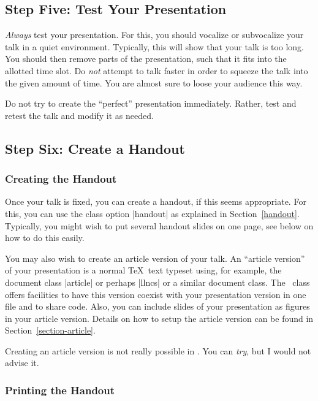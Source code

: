 \subsection{Step Five: Test Your Presentation}

\emph{Always} test your presentation. For this, you should
vocalize or subvocalize your talk in a quiet environment. Typically,
this will show that your talk is too long. You should then remove
parts of the presentation, such that it fits into the allotted time
slot. Do \emph{not} attempt to talk faster in order to squeeze the
talk into the given amount of time. You are almost sure to loose your
audience this way.

Do not try to create the ``perfect'' presentation immediately. Rather,
test and retest the talk and modify it as needed. 




\subsection{Step Six: Create a Handout}

\subsubsection{Creating the Handout}

Once your talk is fixed, you can create a handout, if this seems
appropriate. For this, you can use the class option |handout| as
explained in Section~\ref{handout}. Typically, you might wish
to put several handout slides on one page, see below on how to do
this easily.

You may also wish to create an article version of your talk. An
``article version'' of your presentation is a normal \TeX\ text
typeset using, for example, the document class |article| or perhaps
|llncs| or a similar document class. The \beamer\ class offers
facilities to have this version coexist with your presentation version
in one file and to share code. Also, you can include slides of your
presentation as figures in your article version. Details on how to
setup the article version can be found in
Section~\ref{section-article}.  

\lyxnote
Creating an article version is not really possible in \LyX. You
can \emph{try}, but I would not advise it.


\subsubsection{Printing the Handout}
\label{section-printing-version}

